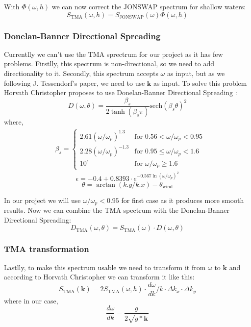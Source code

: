 With $\Phi(\omega, h)$ we can now correct the JONSWAP spectrum for shallow waters:
\begin{equation}
    S_{\text{TMA}}(\omega, h) = S_{\text{JONSWAP}}(\omega) \Phi(\omega, h)
    \label{eq:tma_spectrum}
\end{equation}

\subsubsection{Donelan-Banner Directional Spreading}
Currentlly we can't use the TMA sprectrum for our project as it has few problems. Firstlly, this spectrum is non-directional, so we need to add directionality to it. Secondly, this spectrum accepts $\omega$ as input, but as we following J. Tessendorf's \cite{tessendorf2001} paper, we need to use $\mathbf{k}$ as input.
To solve this problem Horvath Christopher \cite{horvath2015} proposes to use Donelan-Banner Directional Spreading \cite{young1999}:
\begin{equation}
    D(\omega, \theta) = \frac{\beta_s}{2 \tanh(\beta_s\pi)}\text{sech}(\beta_s\theta)^{2}
\end{equation}
where,
$$
\begin{aligned}
    &\beta_s =
    \begin{cases} 
    2.61(\omega/\omega_p)^{1.3} & \text{for } 0.56 < \omega/\omega_p < 0.95 \\
    2.28(\omega/\omega_p)^{-1.3} & \text{for } 0.95 \leq \omega/\omega_p < 1.6 \\
    10^{\epsilon} & \text{for } \omega/\omega_p \geq 1.6
    \end{cases}
\end{aligned}
$$
$$
\epsilon = -0.4 + 0.8393 \cdot e^{-0.567\ln(\omega/\omega_p)^{2}}
$$
$$
\theta = \arctan(k.y / k.x) - \theta_{\text{wind}}
$$

In our project we will use $\omega/\omega_p < 0.95$ for first case as it produces more smooth results.
Now we can combine the TMA spectrum with the Donelan-Banner Directional Spreading:
\begin{equation}
    D_{\text{TMA}}(\omega, \theta) = S_{\text{TMA}}(\omega) \cdot D(\omega, \theta)
\end{equation}

\subsubsection{TMA transformation}
Lastlly, to make this spectrum usable we need to transform it from $\omega$ to $\mathbf{k}$ and according to Horvath Christopher \cite{horvath2015} we can transform it like this:
\begin{equation}
    S_{\text{TMA}}(\mathbf{k}) = 2S_{\text{TMA}}(\omega, h) \cdot \frac{d\omega}{dk} / k \cdot \Delta k_x \cdot \Delta k_y
    \label{eq:tma_spectrum_k}
\end{equation}
where in our case,
$$
\frac{d\omega}{dk} = \frac{g}{2\sqrt{g*\mathbf{k}}}
$$


